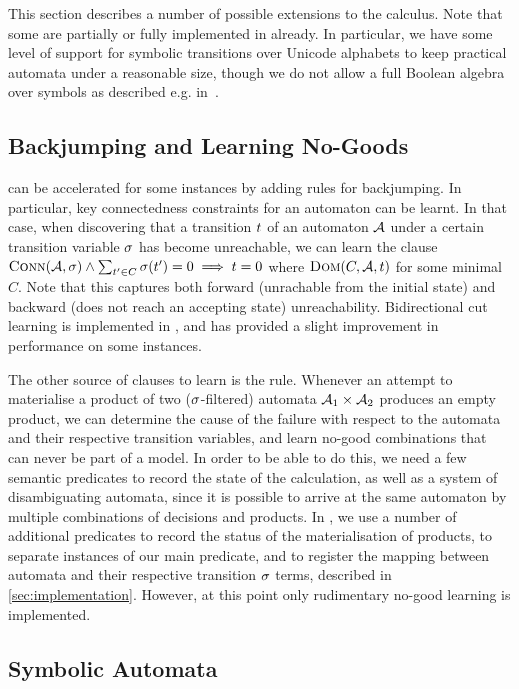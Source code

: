 
This section describes a number of possible extensions to the calculus. Note
that some are partially or fully implemented in \Catra{} already. In particular,
we have some level of support for symbolic transitions over Unicode alphabets to
keep practical automata under a reasonable size, though we do not allow a full Boolean algebra over symbols as described e.g. in~\cite{symbolic-automata}.

\subsection{Backjumping and Learning No-Goods}\label{sec:ext:backjumping}

\Calculus{} can be accelerated for some instances by adding rules for
backjumping. In particular, key connectedness constraints for an automaton can
be learnt. In that case, when discovering that a transition $t$ of an
automaton $\mathcal{A}$ under a certain transition variable $\operatorname{\sigma}$ has become
unreachable, we can learn the clause $\operatorname{\textsc{Conn}}(\mathcal{A}, \operatorname{\sigma}) \land
\sum_{t' \in C} \operatorname{\sigma}(t') = 0 \implies t = 0$ where
$\operatorname{\textsc{Dom}}(C, \mathcal{A}, t)$ for some minimal $C$. Note that this
captures both forward (unrachable from the initial state) and
backward (does not reach an accepting state) unreachability. Bidirectional cut
learning is implemented in \Catra, and has provided a slight improvement in
performance on some instances.

The other source of clauses to learn is the \Materialise{} rule. Whenever an
attempt to materialise a product of two ($\operatorname{\sigma}$-filtered) automata
$\mathcal{A}_1 \times \mathcal{A}_2$ produces an empty product, we can determine
the cause of the failure with respect to the automata and their respective
transition variables, and learn no-good combinations that can never be part of a
model. In order to be able to do this, we need a few semantic predicates to
record the state of the calculation, as well as a system of disambiguating
automata, since it is possible to arrive at the same automaton by multiple
combinations of decisions and products. In \Catra{}, we use a number of
additional predicates to record the status of the materialisation of products,
to separate instances of our main predicate, and to register the mapping between
automata and their respective transition $\operatorname{\sigma}$ terms, described in
\cref{sec:implementation}. However, at this point only rudimentary no-good
learning is implemented.

\subsection{Symbolic Automata}\label{sec:ext:symbolic}

